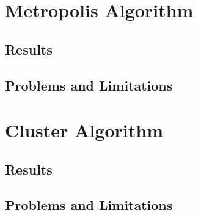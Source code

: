 \documentclass[a4]{scrartcl}
\begin{document}
\section{Metropolis Algorithm}

\subsection{Results}

\subsection{Problems and Limitations}

\section{Cluster Algorithm}

\subsection{Results}

\subsection{Problems and Limitations}

\appendix






\end{document}
